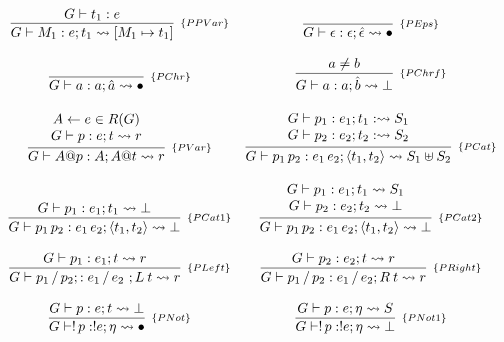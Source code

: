\begin{figure}[H]
  \[
    \begin{array}{cc}
      \infer[_{\{PPVar\}}]{G\vdash M_1 : e ; t_1 \leadsto [M_1 \mapsto t_1]}{G \vdash t_1 : e} &
      \infer[_{\{PEps\}}]{G \vdash \epsilon : \epsilon ; \hat{\epsilon} \leadsto \bullet}{} \\ \\
      \infer[_{\{PChr\}}]{G\vdash a : a ; \hat{a} \leadsto \bullet}{} &
      \infer[_{\{PChrf\}}]{G \vdash a : a  ; \hat{b} \leadsto \bot}{a \neq b}\\ \\
        \infer[_{\{PVar\}}]{G\vdash A@p : A ; A@t \leadsto r}
                        {\begin{array}{c}
                           A \leftarrow e \in R(G) \\
                           G\vdash p : e ; t \leadsto r
                         \end{array}}
        &
        \infer[_{\{PCat\}}]{G\vdash p_1\,p_2 : e_1\,e_2; \langle t_1, t_2 \rangle \leadsto S_1 \uplus S_2}
                        {\begin{array}{c}
                           G\vdash p_1 :e_1 ; t_1 : \leadsto S_1 \\
                           G\vdash p_2 :e_2 ; t_2 :\leadsto S_2
                        \end{array}}\\ \\
      \infer[_{\{PCat1\}}]{G\vdash p_1\,p_2 : e_1 \, e_2  ; \langle t_1, t_2 \rangle \leadsto \bot}
                      {G\vdash p_1 : e_1 ; t_1 \leadsto \bot} &
      \infer[_{\{PCat2\}}]{G\vdash p_1\,p_2 :e_1\,e_2 ; \langle t_1, t_2 \rangle \leadsto \bot}
                        {\begin{array}{c}
                            G\vdash p_1 :e_1 ; t_1 \leadsto S_1 \\
                            G\vdash p_2 :e_2 ; t_2\leadsto \bot
                         \end{array}} \\ \\
      \infer[_{\{PLeft\}}]{G \vdash p_1\,/\,p_2 ;: e_1\,/\,e_2\ ;L\:t \leadsto r}
                       {G\vdash p_1 :e_1 ; t\leadsto r} &
      \infer[_{\{PRight\}}]{G \vdash p_1\,/\,p_2 : e_1\,/\,e_2; R\:t \leadsto r}
                       {G\vdash p_2 : e_2; t \leadsto r} \\ \\
      \infer[_{\{PNot\}}]{G \vdash !\,p : ! e ; \eta \leadsto \bullet}
                      {G \vdash p : e ; t \leadsto \bot} &
      \infer[_{\{PNot1\}}]{G \vdash !\,p : ! e ; \eta \leadsto \bot}
                       {G \vdash p : e ; \eta \leadsto S}\\ \\


\end{array}\]
\end{figure}
